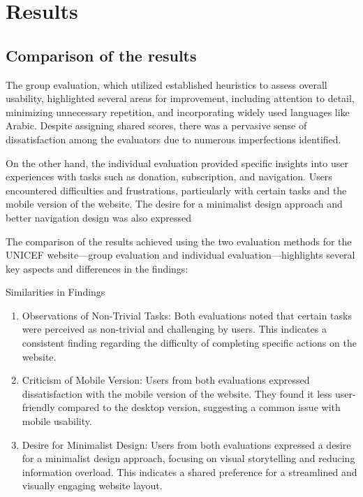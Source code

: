 \section{Results}

\subsection{Comparison of the results}
The group evaluation, which utilized established heuristics to assess overall
usability, highlighted several areas for improvement, including attention to detail,
minimizing unnecessary repetition, and incorporating widely used languages like
Arabic. Despite assigning shared scores, there was a pervasive sense of
dissatisfaction among the evaluators due to numerous imperfections identified.

On the other hand, the individual evaluation provided specific insights into user
experiences with tasks such as donation, subscription, and navigation. Users
encountered difficulties and frustrations, particularly with certain tasks and the
mobile version of the website. The desire for a minimalist design approach and
better navigation design was also expressed

The comparison of the results achieved using the two evaluation methods for the UNICEF website—group evaluation and individual evaluation—highlights several key aspects and differences in the findings:

Similarities in Findings
\begin{enumerate}
\item Observations of Non-Trivial Tasks: Both evaluations noted that certain
tasks were perceived as non-trivial and challenging by users. This indicates a
consistent finding regarding the difficulty of completing specific actions on
the website.

\item Criticism of Mobile Version: Users from both evaluations expressed
dissatisfaction with the mobile version of the website. They found it less
user-friendly compared to the desktop version, suggesting a common issue
with mobile usability.

\item Desire for Minimalist Design: Users from both evaluations expressed a
desire for a minimalist design approach, focusing on visual storytelling and
reducing information overload. This indicates a shared preference for a
streamlined and visually engaging website layout.
\end{enumerate}


